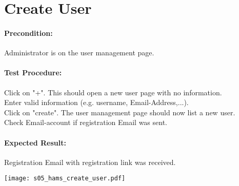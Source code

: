 \documentclass{scrreprt}
\begin{document}
\begin{minipage}[c]{0.4\textwidth}
\section{Create User}

\paragraph{Precondition:}
Administrator is on the user management page.\\


\paragraph{Test Procedure:}
Click on "+". This should open a new user page with no information.\\
Enter valid information (e.g. username, Email-Address,...).\\
Click on "create". The user management page should now list a new user.\\
Check Email-account if registration Email was sent.\\

\paragraph{Expected Result:}
Registration Email with registration link was received.

\end{minipage}
\hfill
\begin{minipage}[c]{0.5\textwidth}
	\texttt{[image: s05\_hams\_create\_user.pdf]}
\end{minipage}
\end{document}

